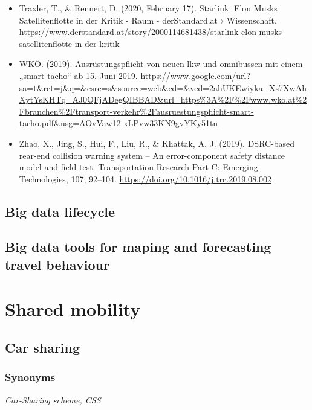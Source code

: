 \documentclass[
]{book}
\begin{document}
\begin{itemize}
\item
  Traxler, T., \& Rennert, D. (2020, February 17). Starlink: Elon Musks Satellitenflotte in der Kritik - Raum - derStandard.at › Wissenschaft. \url{https://www.derstandard.at/story/2000114681438/starlink-elon-musks-satellitenflotte-in-der-kritik}
\item
  WKÖ. (2019). Ausrüstungspflicht von neuen lkw und omnibussen mit einem „smart tacho`` ab 15. Juni 2019. \url{https://www.google.com/url?sa=t\&rct=j\&q=\&esrc=s\&source=web\&cd=\&ved=2ahUKEwiyka_Xs7XwAhXytYsKHTq_AJ0QFjADegQIBBAD\&url=https\%3A\%2F\%2Fwww.wko.at\%2Fbranchen\%2Ftransport-verkehr\%2Fausruestungspflicht-smart-tacho.pdf\&usg=AOvVaw12-xLPvw33KN9gvYKy51tn}
\item
  Zhao, X., Jing, S., Hui, F., Liu, R., \& Khattak, A. J. (2019). DSRC-based rear-end collision warning system -- An error-component safety distance model and field test. Transportation Research Part C: Emerging Technologies, 107, 92--104. \url{https://doi.org/10.1016/j.trc.2019.08.002}
\end{itemize}

\hypertarget{bd_life}{%
\section{Big data lifecycle}\label{bd_life}}

\hypertarget{bd_tool_maping}{%
\section{Big data tools for maping and forecasting travel behaviour}\label{bd_tool_maping}}

\hypertarget{shared}{%
\chapter{Shared mobility}\label{shared}}

\hypertarget{car_sharing}{%
\section{Car sharing}\label{car_sharing}}

\hypertarget{synonyms-39}{%
\subsection*{Synonyms}\label{synonyms-39}}

\emph{Car-Sharing scheme, CSS}
\end{document}
